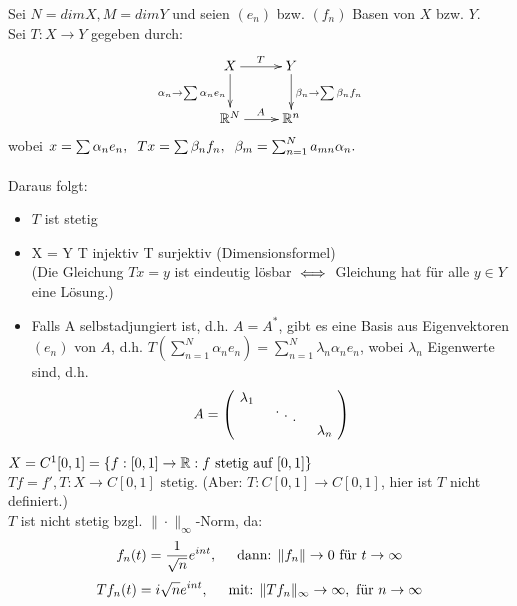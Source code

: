 Sei $N = dim X, M = dim Y$ und seien $(e_n)$ bzw. $(f_n)$ Basen von $X$ bzw. $Y$. 	\\
Sei $T : X \rightarrow Y$ gegeben durch: \\
\[ \begin{xy} \xymatrix{
	X \ar[r]^T	\ar[d]_{ \alpha_{n} \rightarrow \sum \alpha_{n} e_{n} }  &   Y \ar[d]^{ \beta_{n} \rightarrow \sum \beta_{n} f_{n} }  \\
      	\MdR^{N} 	\ar[r]^A    				&   \MdR^{n}  				
} \end{xy} \]
wobei $x = \sum \alpha_{n} e_{n},\hspace{0.2cm} Tx = \sum \beta_n f_n, \hspace{0.2cm} \beta_m = \sum_{n = 1}^{N} a_{mn} \alpha_{n}. $ \\ \\
Daraus folgt:
\begin{itemize}
	\item $T$ ist stetig
	\item X = Y \gdw T injektiv \gdw T surjektiv (Dimensionsformel) \\
	(Die Gleichung $Tx = y$ ist eindeutig lösbar $\iff$ Gleichung hat für alle $y \in Y$ eine Lösung.)
	\item Falls A selbstadjungiert ist, d.h. $A = A^{*}$, gibt es eine Basis aus Eigenvektoren $(e_{n})$ von $A$, d.h. $ T( \sum_{n=1}^{N} \alpha_{n} e_{n} ) = \sum_{n=1}^{N} \lambda_{n} \alpha_{n} e_{n}$, wobei $\lambda_{n}$ Eigenwerte sind, d.h. 
		\[ A =
			\begin{pmatrix}
				\diagentry{\lambda_{1}}\\
				&\diagentry{\xddots}\\
				&&\diagentry{\lambda_{n}}\\
			\end{pmatrix} \]
\end{itemize}


\begin{beispiel}
$X = C^{1}[0, 1] = \{ f : [0, 1] \rightarrow \mathbb{R}: f \text{ stetig auf } [0, 1] \}$ \\
$T f = f', T : X \rightarrow C[0, 1] \text{ stetig.} $ (Aber: $T: C[0, 1] \rightarrow C[0, 1]$, hier ist $T$ nicht definiert.) \\

$T$ ist nicht stetig bzgl. $\| \cdot \|_{\infty}$-Norm, da:
\[ f_{n}(t) = \frac{1}{\sqrt{n}}e^{int}, \hspace{0.5cm}  \text{dann: } \|f_{n}\| \rightarrow 0 \text{ für } t \rightarrow \infty \]	
\[ T f_{n}(t) = i \sqrt{n} e^{int}, \hspace{0.5cm} \text{mit: } \| T f_{n} \|_{\infty} \rightarrow \infty, \text{ für } n \rightarrow \infty \]
\end{beispiel}


